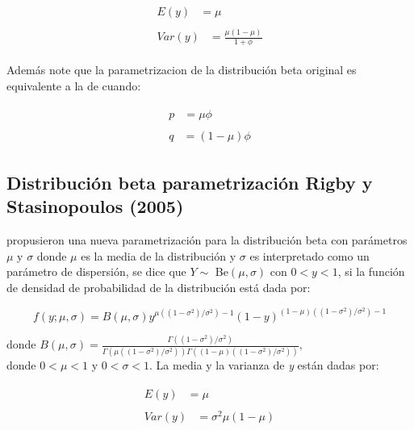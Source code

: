 \begin{align}
\begin{split}
	E(y) &= \mu 
\end{split} \label{E_FC} \\
\begin{split}
	Var(y) &= \frac{\mu(1-\mu)}{1+\phi}
\end{split} \label{V_FC}
\end{align}

Adem\'{a}s note que la parametrizacion de la distribuci\'{o}n beta original es equivalente a la de \cite{Ferrari2} cuando:

\begin{align}
\begin{split}
	p &= \mu\phi
\end{split} \label{FC_Origin1} \\
\begin{split}
q &= (1-\mu)\phi
\end{split} \label{FC_Origin2}
\end{align}

\subsection{Distribuci\'{o}n beta parametrizaci\'{o}n Rigby y Stasinopoulos (2005)}

\cite{Stasinopoulos2} propusieron una nueva parametrizaci\'{o}n para la distribuci\'{o}n beta con par\'{a}metros $\mu$ y $\sigma$ donde $\mu$ es la media de la distribuci\'{o}n y $\sigma$ es interpretado como un par\'{a}metro de dispersi\'{o}n, se dice que $Y \sim$ Be$(\mu,\sigma)$ con $0<y<1$, si la funci\'{o}n de densidad de probabilidad de la distribuci\'{o}n est\'{a} dada por:

\begin{equation}
f(y;\mu,\sigma)=B(\mu,\sigma)y^{\mu((1-\sigma^2)/\sigma^2)-1}(1-y)^{(1-\mu)((1-\sigma^2)/\sigma^2)-1}
\end{equation}

donde $B(\mu,\sigma)=\frac{\Gamma((1-\sigma^2)/\sigma^2)}{\Gamma(\mu((1-\sigma^2)/\sigma^2))\Gamma((1-\mu)((1-\sigma^2)/\sigma^2))},$\\

donde $0<\mu<1$ y $0<\sigma<1$. La media y la varianza de \textit{y} est\'{a}n dadas por:

\begin{align}
\begin{split}
	E(y) &= \mu 
\end{split} \label{E_RS} \\
\begin{split}
	Var(y) &= \sigma^2\mu(1-\mu)
\end{split} \label{V_RS}
\end{align}

